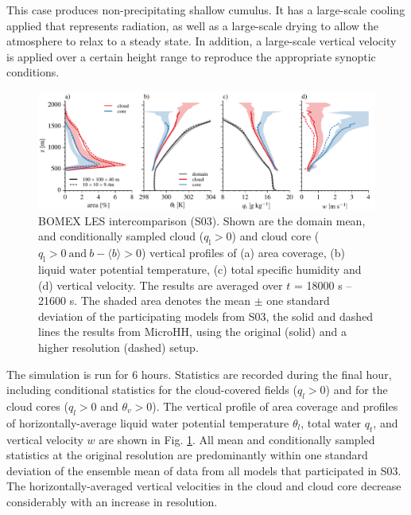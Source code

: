 \documentclass[gmd,manuscript]{copernicus}
\begin{document}
This case produces non-precipitating shallow cumulus. It has a large-scale cooling applied that represents radiation, as well as a large-scale drying to allow the atmosphere to relax to a steady state. In addition, a large-scale vertical velocity is applied over a certain height range to reproduce the appropriate synoptic conditions. 

\begin{figure}[t]
	\vspace*{2mm}
	\begin{center}
		\includegraphics[width=16.6cm]{figs/gmd_bomex_profs.pdf}
	\end{center}
	\caption{BOMEX LES intercomparison (S03). Shown are the domain mean, and conditionally sampled cloud ($q_\mathrm{l} > 0$) and cloud core ($q_\mathrm{l}>0 \ \mathrm{and} \ b-\langle b \rangle > 0$) vertical profiles of (a) area coverage, (b) liquid water potential temperature, (c) total specific humidity and (d) vertical velocity. The results are averaged over $t$ = 18000 s -- 21600 s. The shaded area denotes the mean $\pm$ one standard deviation of the participating models from S03, the solid and dashed lines the results from MicroHH, using the original (solid) and a higher resolution (dashed) setup.}
	\label{fig:bomex}
\end{figure}

The simulation is run for 6 hours. Statistics are recorded during the final hour, including conditional statistics for the cloud-covered fields ($q_l > 0$) and for the cloud cores ($q_l > 0$ and $\theta_v > 0$). The vertical profile of area coverage and profiles of horizontally-average liquid water potential temperature $\theta_l$, total water $q_t$, and vertical velocity $w$ are shown in Fig. \ref{fig:bomex}. All mean and conditionally sampled statistics at the original resolution are predominantly within one standard deviation of the ensemble mean of data from all models that participated in S03. The horizontally-averaged vertical velocities in the cloud and cloud core decrease considerably with an increase in resolution.
\end{document}
